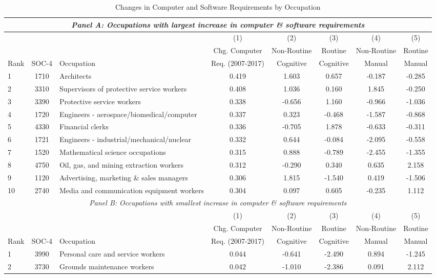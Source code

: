 \documentclass[12pt]{article}
\providecommand{\tabularnewline}{\\}
\begin{document}
{\begin{landscape}
\begin{table}[!tph]
	\caption{Changes in Computer and Software Requirements by Occupation \label{tab: changes_by_occ}}
	\begin{small} 
		\begin{centering}
			\begin{tabular}{lclccccc}
				\hline 
				\multicolumn{8}{c}{\emph{Panel A: Occupations with largest increase in computer \& software requirements} }\tabularnewline
				\hline 
				   &       &  & (1)  & (2)  & (3)  & (4)  & (5) \tabularnewline
				   &       &  & Chg. Computer  & Non-Routine & Routine  & Non-Routine  & Routine\tabularnewline
				Rank       & SOC-4  & Occupation  & Req. (2007-2017)  & Cognitive  & Cognitive & Manual  & Manual\tabularnewline
				\hline 
				1  & 1710  & Architects                                 & 0.419  & 1.603   & 0.657  & -0.187  & -0.285\tabularnewline
				2  & 3310  & Supervisors of protective service workers  & 0.408  & 1.036   & 0.160  & 1.845  & -0.250\tabularnewline
				3  & 3390  & Protective service workers                 & 0.338  & -0.656  & 1.160  & -0.966  & -1.036\tabularnewline
				4  & 1720  & Engineers - aerospace/biomedical/computer  & 0.337  & 0.323   & -0.468 & -1.587  & -0.868\tabularnewline
				5  & 4330  & Financial clerks                           & 0.336  & -0.705  & 1.878  & -0.633  & -0.311\tabularnewline
				6  & 1721  & Engineers - industrial/mechanical/nuclear  & 0.332  & 0.644   & -0.084 & -2.095  & -0.558\tabularnewline
				7  & 1520  & Mathematical science occupations           & 0.315  & 0.888   & -0.789 & -2.455  & -1.355\tabularnewline
				8  & 4750  & Oil, gas, and mining extraction workers    & 0.312  & -0.290  & 0.340  & 0.635  & 2.158\tabularnewline
				9  & 1120  & Advertising, marketing \& sales managers   & 0.306  & 1.815   & -1.540 & 0.419  & -1.506\tabularnewline
				10  & 2740  & Media and communication equipment workers & 0.304  & 0.097   & 0.605  & -0.235  & 1.112\tabularnewline
				\hline 
				\multicolumn{8}{c}{\emph{Panel B: Occupations with smallest increase in computer \& software requirements} }\tabularnewline
				\hline 
				&  &  & (1)  & (2)  & (3)  & (4)  & (5) \tabularnewline
				&  &  & Chg. Computer  & Non-Routine & Routine  & Non-Routine  & Routine\tabularnewline
				Rank  & SOC-4  & Occupation  & Req. (2007-2017)  & Cognitive  & Cognitive & Manual  & Manual\tabularnewline
				\hline 
				1  & 3990  & Personal care and service workers                & 0.044  & -0.641  & -2.490  & 0.894  & -1.245\tabularnewline
				2  & 3730  & Grounds maintenance workers                      & 0.042  & -1.010  & -2.386 & 0.091  & 2.112\tabularnewline

\end{tabular}
\end{centering}
\end{small}
\end{table}
\end{landscape}}
\end{document}
